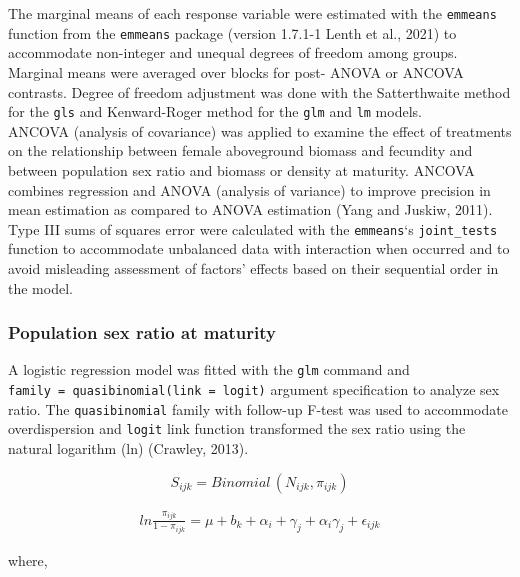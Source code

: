 \documentclass[
]{article}
\begin{document}
The marginal means of each response variable were estimated with the \texttt{emmeans} function from the \texttt{emmeans} package (version 1.7.1-1 Lenth et al., 2021) to accommodate non-integer and unequal degrees of freedom among groups. Marginal means were averaged over blocks for post- ANOVA or ANCOVA contrasts. Degree of freedom adjustment was done with the Satterthwaite method for the \texttt{gls} and Kenward-Roger method for the \texttt{glm} and \texttt{lm} models.\\
ANCOVA (analysis of covariance) was applied to examine the effect of treatments on the relationship between female aboveground biomass and fecundity and between population sex ratio and biomass or density at maturity.
ANCOVA combines regression and ANOVA (analysis of variance) to improve precision in mean estimation as compared to ANOVA estimation (Yang and Juskiw, 2011).\\
Type III sums of squares error were calculated with the \texttt{emmeans}`s \texttt{joint\_tests} function to accommodate unbalanced data with interaction when occurred and to avoid misleading assessment of factors' effects based on their sequential order in the model.

\hypertarget{population-sex-ratio-at-maturity}{%
\subsubsection*{Population sex ratio at maturity}\label{population-sex-ratio-at-maturity}}

A logistic regression model was fitted with the \texttt{glm} command and \texttt{family\ =\ quasibinomial(link\ =\ logit)} argument specification to analyze sex ratio. The \texttt{quasibinomial} family with follow-up F-test was used to accommodate overdispersion and \texttt{logit} link function transformed the sex ratio using the natural logarithm (ln) (Crawley, 2013).

\[ S_{ijk} = Binomial\,(N_{ijk},\pi_{ijk}) \]

\begin{align}
ln \frac{\pi_{ijk}}{1-\pi_{ijk}} = \mu + b_k + \alpha_i + \gamma_j +\alpha_i \gamma_j + \epsilon_{ijk} \label{eq:sex-mature}
\end{align}

where,
\end{document}
